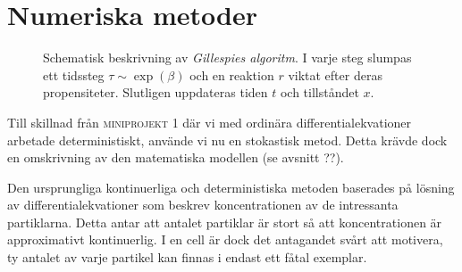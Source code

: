 \section{Numeriska metoder}
\label{sec:metoder}

\begin{figure}
	\centering
	\caption{Schematisk beskrivning av \emph{Gillespies algoritm}. I varje steg slumpas ett tidssteg $\tau \sim \exp(\beta)$ och en reaktion $r$ viktat efter deras propensiteter. Slutligen uppdateras tiden $t$ och tillståndet $x$.}
	\label{fig:gill}
\end{figure}

Till skillnad från \textsc{miniprojekt 1} där vi med ordinära
differentialekvationer arbetade deterministiskt, använde vi nu en
stokastisk metod. Detta krävde dock en omskrivning av den matematiska
modellen (se avsnitt ??).

Den ursprungliga kontinuerliga och deterministiska metoden baserades på
lösning av differentialekvationer som beskrev koncentrationen av de intressanta
partiklarna. Detta antar att antalet partiklar är stort så att koncentrationen
är approximativt kontinuerlig. I en cell är dock det antagandet svårt att
motivera, ty antalet av varje partikel kan finnas i endast ett fåtal exemplar.

